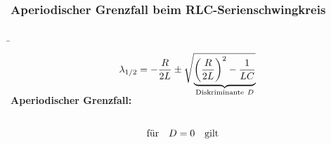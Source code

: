 \subsubsection[Aperiodischer Grenzfall]{Aperiodischer Grenzfall beim RLC-Serienschwingkreis}
\label{sec:schaltvorgaengezeitbereich:rlc:grenzfall}

\begin{frame}[t]\ftx{\subsubsecname}
\b{%
\begin{minipage}{\textwidth}\centering
    \begin{minipage}[t][3cm][]{0.48\textwidth}\centering
    \end{minipage}%
    \begin{minipage}[t][3cm][]{0.48\textwidth}\centering
        \begin{align*}
            \lambda_{1/2} = -\frac{R}{2L} \pm \sqrt{
                \smash{\underbrace{%
                \left(\frac{R}{2L}\right)^2 - \frac{1}{LC}
                }_{\mathclap{\text{Diskriminante}\ D}}}
                \vphantom{\left(\frac{R}{2L}\right)^2 - \frac{1}{LC}}%
            }%
        \end{align*}
    \end{minipage}
\end{minipage}\vspace{2pt}
    \textbf{Aperiodischer Grenzfall:}
}%
\ifvmode\vspace*{-\baselineskip}\setlength{\parskip}{4pt}\fi%
\begin{align*}
    \vphantom{\sqrt{\left(\frac{R}{2L}\right)^2}}
    &\text{für}\quad D = 0 \quad\text{gilt}&

\end{align*}
\end{frame}
